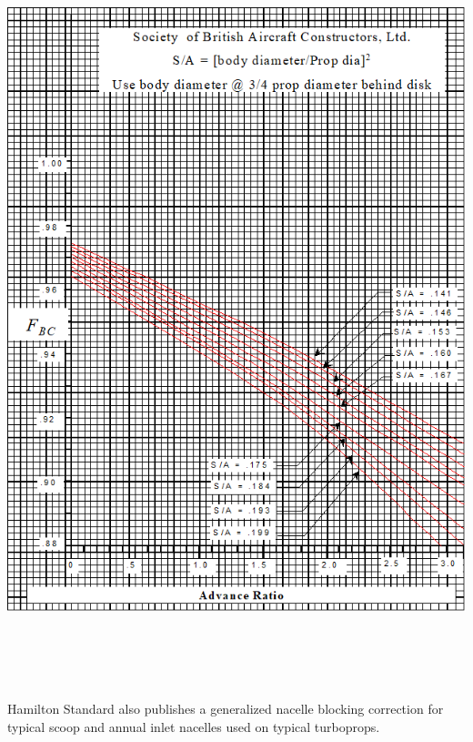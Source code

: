 \documentclass[
]{book}
\begin{document}
\includegraphics[width=6.49931in,height=8.56111in]{media/11/image25.png}

Hamilton Standard also publishes a generalized nacelle blocking correction for typical scoop and annual inlet nacelles used on typical turboprops.
\end{document}
